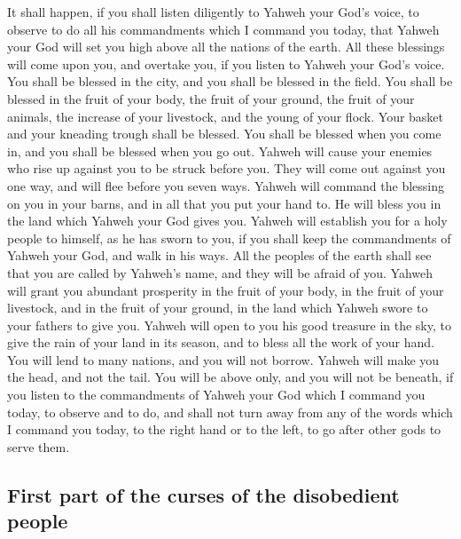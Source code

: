  It shall happen, if you shall listen diligently to Yahweh
your God's voice, to observe to do all his commandments which I command
you today, that Yahweh your God will set you high above all the nations
of the earth.  All these blessings will come upon you, and
overtake you, if you listen to Yahweh your God's voice. 
You shall be blessed in the city, and you shall be blessed in the field.
 You shall be blessed in the fruit of your body, the fruit
of your ground, the fruit of your animals, the increase of your
livestock, and the young of your flock.  Your basket and
your kneading trough shall be blessed.  You shall be
blessed when you come in, and you shall be blessed when you go out.
 Yahweh will cause your enemies who rise up against you to
be struck before you. They will come out against you one way, and will
flee before you seven ways.  Yahweh will command the
blessing on you in your barns, and in all that you put your hand to. He
will bless you in the land which Yahweh your God gives you.
 Yahweh will establish you for a holy people to himself,
as he has sworn to you, if you shall keep the commandments of Yahweh
your God, and walk in his ways.  All the peoples of the
earth shall see that you are called by Yahweh's name, and they will be
afraid of you.  Yahweh will grant you abundant prosperity
in the fruit of your body, in the fruit of your livestock, and in the
fruit of your ground, in the land which Yahweh swore to your fathers to
give you.  Yahweh will open to you his good treasure in
the sky, to give the rain of your land in its season, and to bless all
the work of your hand. You will lend to many nations, and you will not
borrow.  Yahweh will make you the head, and not the tail.
You will be above only, and you will not be beneath, if you listen to
the commandments of Yahweh your God which I command you today, to
observe and to do,  and shall not turn away from any of
the words which I command you today, to the right hand or to the left,
to go after other gods to serve them.

\hypertarget{first-part-of-the-curses-of-the-disobedient-people}{%
\subsection{First part of the curses of the disobedient
people}\label{first-part-of-the-curses-of-the-disobedient-people}}

